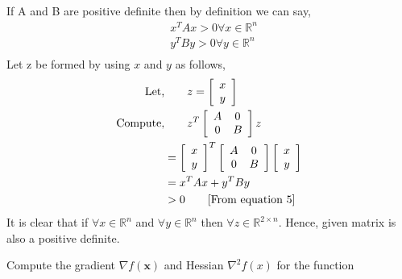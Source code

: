 \documentclass[a4paper,10pt]{article}
\newcommand{\R}{\mathbb{R}}
\begin{document}
\begin{enumerate}
    If A and B are positive definite then by definition we can say,
    \begin{equation}
    \begin{split}
        & x^{T}Ax > 0 \forall x \in \R^{n} \\
        & y^{T}By > 0 \forall y \in \R^{n} \\
    \end{split}
    \end{equation}
   Let z be formed by using $x$ and $y$ as follows,
    \begin{equation}
    \begin{split}
        \text{Let,} & \hspace{2em} z = \left[\begin{array}{c c} x \\ y \end{array} \right]\\
        \text{Compute,} & \hspace{2em} z^T\left[\begin{array}{c c} A  &0 \\ 0 &B \end{array} \right]z \\
        & = \left[\begin{array}{c c} x \\ y \end{array} \right]^T\left[\begin{array}{c c} A  &0 \\ 0 &B \end{array} \right]\left[\begin{array}{c c} x \\ y \end{array} \right] \\
        & = x^{T}Ax + y^{T}By \\
        & > 0 \hspace{2em} \text{[From equation 5]} \\ 
    \end{split}
    \end{equation}
    It is clear that if $\forall x \in \R^{n}$ and  $\forall y \in \R^{n}$ then $\forall z \in \R^{2 \times n}$. Hence, given matrix is also a positive definite.
    \\
    \begin{taskbox}
    Compute the gradient $\nabla f(\mathbf{x})$ and Hessian $\nabla^2f(x)$ for the function 
    \begin{equation}

\end{equation}
\end{taskbox}
\end{enumerate}
\end{document}
